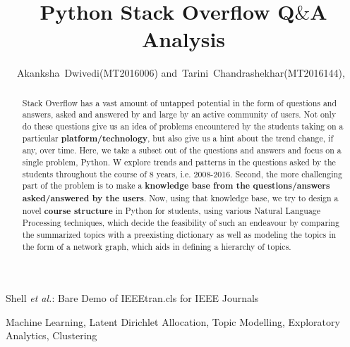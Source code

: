 \documentclass[journal]{IEEEtran}
\begin{document}
\title{Python Stack Overflow Q$\&$A Analysis}
\author{Akanksha~Dwivedi(MT2016006)
        and~Tarini~Chandrashekhar(MT2016144),~}%

%
{Shell \MakeLowercase{\textit{et al.}}: Bare Demo of IEEEtran.cls for IEEE Journals}


\maketitle

\begin{abstract}
Stack Overflow has a vast amount of untapped potential in the form of questions and answers, asked and answered by and large by an active community of users. Not only do these questions give us an idea of problems encountered by the students taking on a particular \textbf{platform/technology}, but also give us a hint about the trend change, if any, over time. Here, we take a subset out of the questions and answers and focus on a single problem, Python. W explore trends and patterns in the questions asked by the students throughout the course of 8 years, i.e. 2008-2016. Second, the more challenging part of the problem is to make a \textbf{knowledge base from the questions/answers asked/answered by the users}. Now, using that knowledge base, we try to design a novel \textbf{course structure} in Python for students, using various Natural Language Processing techniques, which decide the feasibility of such an endeavour by comparing the summarized topics with a preexisting dictionary as well as modeling the topics in the form of a network graph, which aids in defining a hierarchy of topics.
\end{abstract}

\begin{IEEEkeywords}
Machine Learning, Latent Dirichlet Allocation, Topic Modelling, Exploratory Analytics, Clustering
\end{IEEEkeywords}

\IEEEpeerreviewmaketitle
\end{document}
